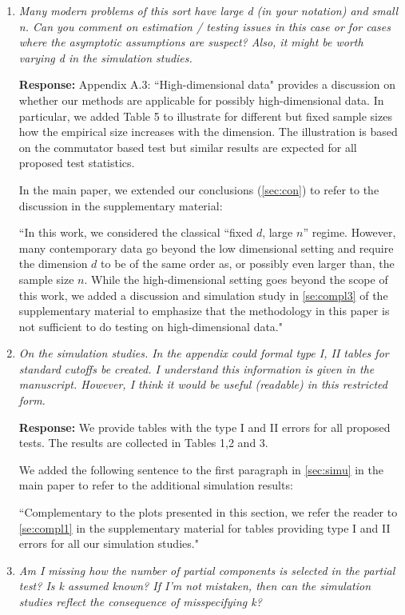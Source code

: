 \documentclass[12pt]{article}
\numberwithin{equation}{section}
\numberwithin{table}{section}
\numberwithin{thm}{section}
\numberwithin{defn}{section}
\numberwithin{lem}{section}
\numberwithin{prop}{section}
\numberwithin{cor}{section}
\numberwithin{rem}{section}
\begin{document}
\begin{enumerate}

\item
\textit{Many modern problems of this sort have large d (in your notation) and small n. Can you comment on estimation / testing issues in this case or for cases where the asymptotic assumptions are suspect? Also, it might be worth varying d in the simulation studies.}

\textbf{Response:}
Appendix A.3: ``High-dimensional data" provides a discussion on whether our methods are applicable for possibly high-dimensional data. In particular, we added Table 5 to illustrate for different but fixed sample sizes how the empirical size increases with the dimension. The illustration is based on the commutator based test but similar results are expected for all proposed test statistics.

In the main paper, we extended our conclusions (\autoref{sec:con}) to refer to the discussion in the supplementary material:

``In this work, we considered the classical ``fixed $d$, large $n$” regime. However, many contemporary data go beyond the low dimensional setting and require the dimension $d$ to be of the same order as, or possibly even larger than, the sample size $n$.
While the high-dimensional setting goes beyond the scope of this work, we added a discussion and simulation study in \autoref{se:compl3} of the supplementary material to emphasize that the methodology in this paper is not sufficient to do testing on high-dimensional data."

\item
\textit{On the simulation studies. In the appendix could formal type I, II tables for standard cutoffs be created. I understand this information is given in the manuscript. However, I think it would be useful (readable) in this restricted form.}

\textbf{Response:}
We provide tables with the type I and II errors for all proposed tests. The results are collected in Tables 1,2 and 3.

We added the following sentence to the first paragraph in \autoref{sec:simu} in the main paper to refer to the additional simulation results:

``Complementary to the plots presented in this section, we refer the reader to \autoref{se:compl1} in the supplementary material for tables providing type I and II errors for all our simulation studies."

\item
\textit{Am I missing how the number of partial components is selected in the partial test? Is k assumed known? If I'm not mistaken, then can the simulation studies reflect the consequence of misspecifying k?}


\end{enumerate}
\end{document}
